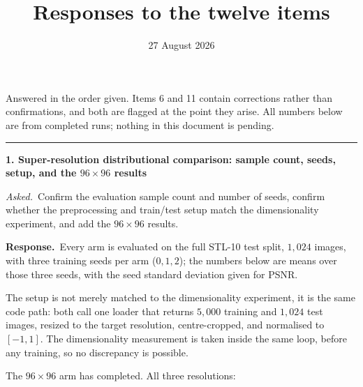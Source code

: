 \documentclass[11pt]{article}
\title{Responses to the twelve items}
\author{}
\date{27 August 2026}
\newenvironment{item12}[1]{%
  \par\medskip\noindent\rule{\textwidth}{0.7pt}\par\nobreak\smallskip
  \noindent\textbf{\large #1}\par\nobreak\smallskip
}{\par\medskip}
\newcommand{\ask}[1]{\noindent\emph{Asked.}\ #1\par\smallskip}
\newcommand{\resp}{\noindent\textbf{Response.}\ }
\begin{document}
\maketitle

Answered in the order given. Items 6 and 11 contain corrections rather than confirmations, and
both are flagged at the point they arise. All numbers below are from completed runs; nothing in
this document is pending.

\begin{item12}{1. Super-resolution distributional comparison: sample count, seeds, setup, and
the $96\times96$ results}
\ask{Confirm the evaluation sample count and number of seeds, confirm whether the preprocessing
and train/test setup match the dimensionality experiment, and add the $96\times96$ results.}

\resp Every arm is evaluated on the full STL-10 test split, $1{,}024$ images, with three
training seeds per arm ($0,1,2$); the numbers below are means over those three seeds, with the
seed standard deviation given for PSNR.

The setup is not merely matched to the dimensionality experiment, it is the same code path: both
call one loader that returns $5{,}000$ training and $1{,}024$ test images, resized to the target
resolution, centre-cropped, and normalised to $[-1,1]$. The dimensionality measurement is taken
inside the same loop, before any training, so no discrepancy is possible.

The $96\times96$ arm has completed. All three resolutions:


\end{item12}
\end{document}
